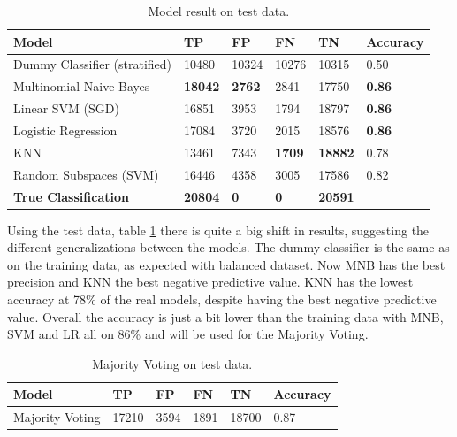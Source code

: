 \begin{table}[H]
    \centering
    \caption{Model result on test data.}
    \label{tab:test-table}
    \begin{tabular}{@{}llllll@{}}
    \toprule
    Model                         & TP             & FP            & FN            & TN             & Accuracy      \\ \midrule
    Dummy Classifier (stratified) & 10480          & 10324         & 10276         & 10315          & 0.50          \\
    Multinomial Naive Bayes       & \textbf{18042} & \textbf{2762} & 2841          & 17750          & \textbf{0.86} \\
    Linear SVM (SGD)              & 16851          & 3953          & 1794          & 18797          & \textbf{0.86} \\
    Logistic Regression           & 17084          & 3720          & 2015          & 18576          & \textbf{0.86} \\
    KNN                           & 13461          & 7343          & \textbf{1709} & \textbf{18882} & 0.78          \\
    Random Subspaces (SVM)        & 16446          & 4358          & 3005          & 17586          & 0.82          \\ \midrule
    \textbf{True Classification}  & \textbf{20804} & \textbf{0}    & \textbf{0}    & \textbf{20591} & \textbf{}    
    \end{tabular}
\end{table}


Using the test data, table \ref{tab:test-table} there is quite a big shift in results, suggesting the different generalizations between the models. 
The dummy classifier is the same as on the training data, as expected with balanced dataset. 
Now MNB has the best precision and KNN the best negative predictive value. 
KNN has the lowest accuracy at 78\% of the real models, despite having the best negative predictive value. 
Overall the accuracy is just a bit lower than the training data with MNB, SVM and LR all on 86\% and will be used for the Majority Voting. 


\begin{table}[H]
    \centering
    \caption{Majority Voting on test data.}
    \label{tab:voting-table}
    \begin{tabular}{@{}llllll@{}}
    \toprule
    Model                  & TP    & FP   & FN   & TN    & Accuracy \\ \midrule
    Majority Voting     & 17210 & 3594 & 1891 & 18700 & 0.87     \\ \bottomrule
    \end{tabular}
\end{table}


